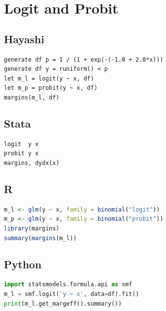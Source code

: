 \section{Logit and Probit}

\subsection*{Hayashi}

\begin{lstlisting}
generate df p = 1 / (1 + exp(-(-1.0 + 2.0*x)))
generate df y = runiform() < p
let m_l = logit(y ~ x, df)
let m_p = probit(y ~ x, df)
margins(m_l, df)
\end{lstlisting}

\subsection*{Stata}

\begin{lstlisting}[language={}, basicstyle=\ttfamily\small,
  frame=single, numbers=none, backgroundcolor=\color{codbg}]
logit  y x
probit y x
margins, dydx(x)
\end{lstlisting}

\subsection*{R}

\begin{lstlisting}[language=R, basicstyle=\ttfamily\small,
  frame=single, numbers=none, backgroundcolor=\color{codbg},
  keywordstyle=\color{keyword}\bfseries,
  stringstyle=\color{string},
  commentstyle=\color{comment}\itshape]
m_l <- glm(y ~ x, family = binomial("logit"))
m_p <- glm(y ~ x, family = binomial("probit"))
library(margins)
summary(margins(m_l))
\end{lstlisting}

\subsection*{Python}

\begin{lstlisting}[language=Python, basicstyle=\ttfamily\small,
  frame=single, numbers=none, backgroundcolor=\color{codbg},
  keywordstyle=\color{keyword}\bfseries,
  stringstyle=\color{string},
  commentstyle=\color{comment}\itshape]
import statsmodels.formula.api as smf
m_l = smf.logit('y ~ x', data=df).fit()
print(m_l.get_margeff().summary())
\end{lstlisting}

